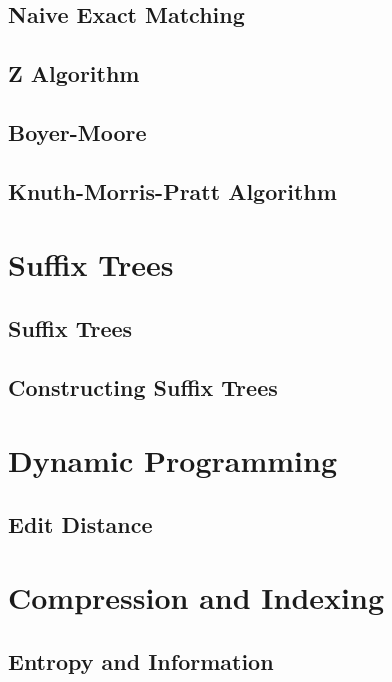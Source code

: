 \documentclass[nobib]{tufte-book}
\begin{document}
\chapter{Naive Exact Matching}


\chapter{Z Algorithm}


\chapter{Boyer-Moore}


\chapter{Knuth-Morris-Pratt Algorithm}

\part{Suffix Trees}

\chapter{Suffix Trees}


\chapter{Constructing Suffix Trees}


\part{Dynamic Programming}

\chapter{Edit Distance}

\part{Compression and Indexing}

\chapter{Entropy and Information}
\end{document}
